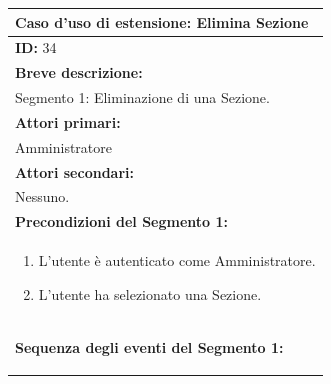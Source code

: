 \documentclass{article}
\begin{document}
                
                \begin{table}[H]
                    \begin{tabular}{|p{\linewidth}|}
                        \hline
                        \cellcolor{gray!100}
                        \color{white}
                        \centerline{\textbf{Caso d'uso di estensione:} Elimina Sezione} \\
                        \hline
                        \textbf{ID:} 34 \\
                        \hline
                        \cellcolor{gray!20}
                        \textbf{Breve descrizione:} \\
                        \cellcolor{gray!20}
                        Segmento 1: Eliminazione di una Sezione. \\
                        \hline
                        \textbf{Attori primari:} \\
                        \begin{minipage}{\linewidth}
                            Amministratore
                        \end{minipage}
                        \vspace{-10pt} \\ 
                        \hline
                        \textbf{Attori secondari:} \\
                        Nessuno. \\
                        \hline
                        \cellcolor{gray!20}
                        \textbf{Precondizioni del Segmento 1:} \\
                        \cellcolor{gray!20}
                        \begin{minipage}{\linewidth}
                            \begin{enumerate}
                                \item L'utente è autenticato come Amministratore.
                                \item L'utente ha selezionato una Sezione.
                            \end{enumerate}
                        \end{minipage} 
                        \vspace{-5pt} \\
                        \hline
                        \textbf{Sequenza degli eventi del Segmento 1:}
                        \begin{enumerate}

\end{enumerate}
\end{tabular}
\end{table}
\end{document}
